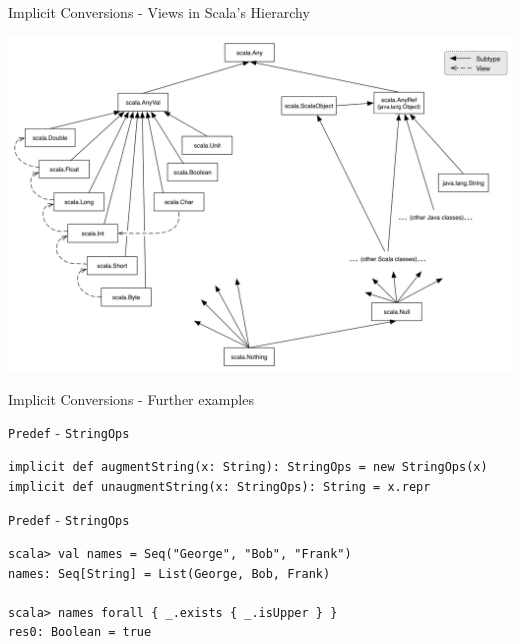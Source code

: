 \begin{frame}{Implicit Conversions - Views in Scala's Hierarchy}
\begin{center}
\includegraphics[width=\textwidth]{resources/Hierarchy.png}
\end{center}
\end{frame}

\begin{frame}[fragile]{Implicit Conversions - Further examples}
\begin{exampleblock}{\lstinline!Predef! - \lstinline!StringOps!}
\begin{lstlisting}
implicit def augmentString(x: String): StringOps = new StringOps(x)
implicit def unaugmentString(x: StringOps): String = x.repr
\end{lstlisting}
\end{exampleblock}

\begin{exampleblock}{\lstinline!Predef! - \lstinline!StringOps!}
\begin{lstlisting}
scala> val names = Seq("George", "Bob", "Frank")
names: Seq[String] = List(George, Bob, Frank)

scala> names forall { _.exists { _.isUpper } }
res0: Boolean = true
\end{lstlisting}
\end{exampleblock}
\end{frame}

